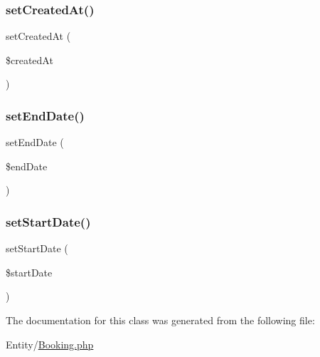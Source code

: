 \mbox{\label{class_app_1_1_entity_1_1_booking_a2308609ef549a753223bbee71e36291e}} 
\subsubsection{\texorpdfstring{setCreatedAt()}{setCreatedAt()}}
{\footnotesize\ttfamily set\+Created\+At (\begin{DoxyParamCaption}\item[{\textbackslash{}Date\+Time\+Interface}]{\$created\+At }\end{DoxyParamCaption})}

\mbox{\label{class_app_1_1_entity_1_1_booking_a881b5c57e493b646e6618e219562fe2c}} 
\subsubsection{\texorpdfstring{setEndDate()}{setEndDate()}}
{\footnotesize\ttfamily set\+End\+Date (\begin{DoxyParamCaption}\item[{\textbackslash{}Date\+Time\+Interface}]{\$end\+Date }\end{DoxyParamCaption})}

\mbox{\label{class_app_1_1_entity_1_1_booking_a7aa58871c611fdb3e63186359f9c6d28}} 
\subsubsection{\texorpdfstring{setStartDate()}{setStartDate()}}
{\footnotesize\ttfamily set\+Start\+Date (\begin{DoxyParamCaption}\item[{\textbackslash{}Date\+Time\+Interface}]{\$start\+Date }\end{DoxyParamCaption})}



The documentation for this class was generated from the following file\+:\begin{DoxyCompactItemize}
\item 
Entity/\mbox{\hyperlink{_booking_8php}{Booking.\+php}}\end{DoxyCompactItemize}
